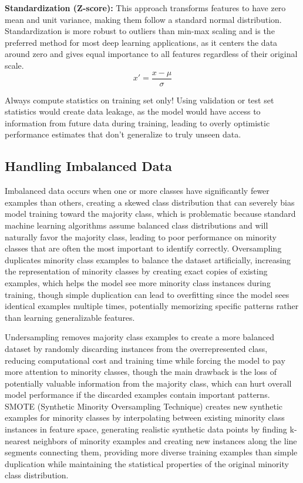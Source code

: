 \textbf{Standardization (Z-score):} This approach transforms features to have zero mean and unit variance, making them follow a standard normal distribution. Standardization is more robust to outliers than min-max scaling and is the preferred method for most deep learning applications, as it centers the data around zero and gives equal importance to all features regardless of their original scale.
\begin{equation}
x' = \frac{x - \mu}{\sigma}
\end{equation}

Always compute statistics on training set only!  Using validation or test set statistics would create data leakage, as the model would have access to information from future data during training, leading to overly optimistic performance estimates that don't generalize to truly unseen data.


\subsection{Handling Imbalanced Data}

Imbalanced data occurs when one or more classes have significantly fewer examples than others, creating a skewed class distribution that can severely bias model training toward the majority class, which is problematic because standard machine learning algorithms assume balanced class distributions and will naturally favor the majority class, leading to poor performance on minority classes that are often the most important to identify correctly. Oversampling duplicates minority class examples to balance the dataset artificially, increasing the representation of minority classes by creating exact copies of existing examples, which helps the model see more minority class instances during training, though simple duplication can lead to overfitting since the model sees identical examples multiple times, potentially memorizing specific patterns rather than learning generalizable features.

Undersampling removes majority class examples to create a more balanced dataset by randomly discarding instances from the overrepresented class, reducing computational cost and training time while forcing the model to pay more attention to minority classes, though the main drawback is the loss of potentially valuable information from the majority class, which can hurt overall model performance if the discarded examples contain important patterns. SMOTE (Synthetic Minority Oversampling Technique) creates new synthetic examples for minority classes by interpolating between existing minority class instances in feature space, generating realistic synthetic data points by finding k-nearest neighbors of minority examples and creating new instances along the line segments connecting them, providing more diverse training examples than simple duplication while maintaining the statistical properties of the original minority class distribution.

